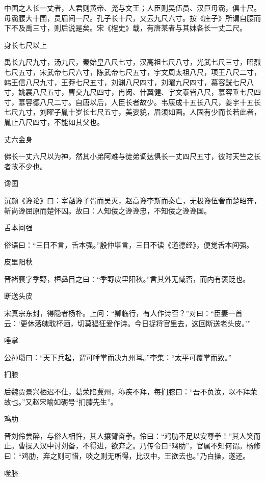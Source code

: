 \documentclass[a4paper,12pt,UTF8,twoside]{ctexbook}
\begin{document}
    中国之人长一丈者，人君则黄帝、尧与文王；人臣则吴伍员、汉巨毋霸，俱十尺。毋霸腰大十围，员眉间一尺。孔子长十尺，又云九尺六寸。按《庄子》所谓自腰而下不及禹三寸，则后说是矣。宋《桯史》载，有唐某者与其妹各长一丈二尺。
    
    身长七尺以上
    
    禹长九尺九寸，汤九尺，秦始皇八尺七寸，汉高祖七尺八寸，光武七尺三寸，昭烈七尺五寸，宋武帝七尺六寸，陈武帝七尺五寸，宇文周太祖八尺，项王八尺二寸，韩王信八尺九寸，王莽七尺五寸，刘渊八尺四寸，刘曜九尺四寸，慕容皝七尺八寸，姚襄八尺五寸，曹交九尺四寸，冉闵、什翼健、宇文泰皆八尺，慕容垂七尺四寸，慕容德八尺二寸。自唐以后，人臣长者故少。韦康成十五长八尺，姜宇十五长七尺九寸，刘曜子胤十岁长七尺五寸，美姿貌，眉须如画。人固有少而长若此者，胤止八尺四寸，不能如其父也。
    
    丈六金身
    
    佛长一丈六尺以为神，然其小弟阿难与徒弟调达俱长一丈四尺五寸，彼时天竺之长者故不少也。
    
    谗国
    
    沉颜《谗论》曰：宰嚭谗子胥而吴灭，赵高谗李斯而秦亡，无极谗伍奢而楚昭奔，靳尚谗屈原而楚怀囚。故曰：人知佞之谗谗忠，不知佞之谗谗国。
    
    舌本间强
    
    俗语曰：“三日不言，舌本强。”殷仲堪言，三日不读《道德经》，便觉舌本间强。
    
    皮里阳秋
    
    晋褚裒字季野，桓彝目之曰：“季野皮里阳秋。”言其外无臧否，而内有褒贬也。
    
    断送头皮
    
    宋真宗东封，得隐者杨朴。上问：“卿临行，有人作诗否？”对曰：“臣妻一首云：‘更休落魄耽杯酒，切莫猖狂爱作诗。今日捉将官里去，这回断送老头皮。’”
    
    唾掌
    
    公孙瓒曰：“天下兵起，谓可唾掌而决九州耳。”李集：“太平可覆掌而致。”
    
    扪膝
    
    后魏贾景兴栖迟不仕，葛荣陷冀州，称疾不拜，每扪膝曰：“吾不负汝，以不拜荣故也。”又赵宋喻如砺号“扪膝先生”。
    
    鸡肋
    
    晋刘伶尝醉，与俗人相忤，其人攘臂奋拳。伶曰：“鸡肋不足以安尊拳！”其人笑而止。曹操入汉中讨刘备，不得进，欲弃之。乃传令曰“鸡肋”，官属不知何谓。杨修曰：“鸡肋，弃之则可惜，啖之则无所得，比汉中，王欲去也。”乃白操，遂还。
    
    噬脐
    
\end{document}
